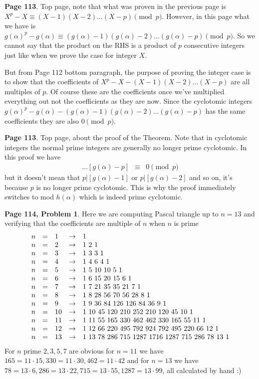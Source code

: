 \documentclass[aps,preprint,preprintnumbers,nofootinbib,showpacs,prd]{revtex4-1}
\newcommand{\nbea}{\begin{eqnarray*}}
\newcommand{\neea}{\end{eqnarray*}}
\begin{document}
{\bf Page 113}. Top page, note that what was proven in the previous page is $X^p - X \equiv (X - 1)(X - 2) \dots (X - p) \pmod{p}$. However, in this page what we have is $g(\alpha)^p - g(\alpha) \equiv (g(\alpha) - 1)(g(\alpha) - 2)\dots (g(\alpha) - p) \pmod{p}$. So we cannot say that the product on the RHS is a product of $p$ consecutive integers just like when we prove the case for integer $X$.

But from Page 112 bottom paragraph, the purpose of proving the integer case is to show that the coefficients of $X^p - X - (X - 1)(X - 2) \dots (X - p)$ are all multiples of $p$. Of course these are the coefficients once we've multiplied everything out not the coefficients as they are now. Since the cyclotomic integers $g(\alpha)^p - g(\alpha) - (g(\alpha) - 1)(g(\alpha) - 2)\dots (g(\alpha) - p)$ has the same coefficients they are also $0 \pmod{p}$.

{\bf Page 113}. Top page, about the proof of the Theorem. Note that in cyclotomic integers the normal prime integers are generally no longer prime cyclotomic. In this proof we have
%
\nbea
[g(\alpha) - 1][g(\alpha) - 2] \dots [g(\alpha) - p] & \equiv & 0 \pmod{p}
\neea
%
but it doesn't mean that $p|[g(\alpha) - 1]$ or $p|[g(\alpha) - 2]$ and so on, it's because $p$ is no longer prime cyclotomic. This is why the proof immediately switches to mod $h(\alpha)$ which is indeed prime cyclotomic.

{\bf Page 114, Problem 1}. Here we are computing Pascal triangle up to $n = 13$ and verifying that the coefficients are multiple of $n$ when $n$ is prime
%
\nbea
\begin{array}{r c l c l}
n & = & 1 & \to & 1 \\
n & = & 2 & \to & 1 ~2~ 1 \\
n & = & 3 & \to & 1 ~3~ 3~ 1 \\
n & = & 4 & \to & 1 ~4~ 6~ 4~ 1 \\
n & = & 5 & \to & 1 ~5~ 10 ~10 ~5~ 1 \\
n & = & 6 & \to & 1~ 6~ 15~ 20~ 15~ 6~ 1 \\
n & = & 7 & \to & 1 ~7~ 21~ 35~ 35~ 21~ 7~ 1 \\
n & = & 8 & \to & 1 ~8~ 28~ 56~ 70~ 56~ 28~ 8~ 1 \\
n & = & 9 & \to & 1 ~9 ~36~ 84 ~126~ 126~ 84~ 36~ 9~ 1 \\
n & = & 10 & \to & 1~ 10~ 45~ 120~ 210 ~252 ~210~ 120~ 45~ 10~ 1 \\
n & = & 11 & \to & 1~ 11~ 55~ 165~ 330 ~462 ~462~ 330~ 165~ 55~ 11~ 1 \\
n & = & 12 & \to & 1~ 12~ 66~ 220~ 495 ~792 ~924~ 792~ 495~ 220~ 66~ 12~ 1 \\
n & = & 13 & \to & 1~ 13~ 78~ 286~ 715 ~1287~ 1716~ 1287~ 715~ 286~ 78~ 13~ 1
\end{array}
\neea
%
For $n$ prime $2, 3, 5, 7$ are obvious for $n = 11$ we have $165 = 11 \cdot 15, 330 = 11\cdot 30, 462 = 11 \cdot 42$ and for $n = 13$ we have $78 = 13 \cdot 6, 286 = 13 \cdot 22, 715 = 13 \cdot 55, 1287 = 13 \cdot 99$, all calculated by hand :) 
\end{document}
